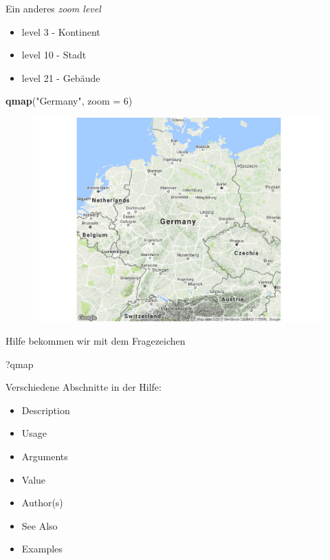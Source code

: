 \documentclass[ignorenonframetext,]{beamer}
\newenvironment{Shaded}{}{}
\newcommand{\KeywordTok}[1]{\textcolor[rgb]{0.00,0.44,0.13}{\textbf{{#1}}}}
\newcommand{\DataTypeTok}[1]{\textcolor[rgb]{0.56,0.13,0.00}{{#1}}}
\newcommand{\DecValTok}[1]{\textcolor[rgb]{0.25,0.63,0.44}{{#1}}}
\newcommand{\StringTok}[1]{\textcolor[rgb]{0.25,0.44,0.63}{{#1}}}
\newcommand{\NormalTok}[1]{{#1}}
\providecommand{\tightlist}{%
\setlength{\itemsep}{0pt}\setlength{\parskip}{0pt}}
\begin{document}
\begin{frame}[fragile]{Ein anderes \emph{zoom level}}

\begin{itemize}
\tightlist
\item
  level 3 - Kontinent
\item
  level 10 - Stadt
\item
  level 21 - Gebäude
\end{itemize}

\begin{Shaded}
\begin{Highlighting}[]
\KeywordTok{qmap}\NormalTok{(}\StringTok{"Germany"}\NormalTok{, }\DataTypeTok{zoom =} \DecValTok{6}\NormalTok{)}
\end{Highlighting}
\end{Shaded}

\begin{figure}[htbp]
\centering
\includegraphics{RSocialScience2_files/figure-beamer/unnamed-chunk-30-1.pdf}
\caption{}
\end{figure}

\end{frame}

\begin{frame}[fragile]{Hilfe bekommen wir mit dem Fragezeichen}

\begin{Shaded}
\begin{Highlighting}[]
\NormalTok{?qmap}
\end{Highlighting}
\end{Shaded}

Verschiedene Abschnitte in der Hilfe:

\begin{itemize}
\tightlist
\item
  Description
\item
  Usage
\item
  Arguments
\item
  Value
\item
  Author(s)
\item
  See Also
\item
  Examples
\end{itemize}

\end{frame}
\end{document}
